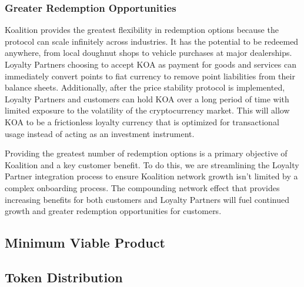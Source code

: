 \subsubsection{Greater Redemption Opportunities}
Koalition provides the greatest flexibility in redemption options because the protocol can scale infinitely across industries. It has the potential to be redeemed anywhere, from local doughnut shops to vehicle purchases at major dealerships. Loyalty Partners choosing to accept KOA as payment for goods and services can immediately convert points to fiat currency to remove point liabilities from their balance sheets. Additionally, after the price stability protocol is implemented, Loyalty Partners and customers can hold KOA over a long period of time with limited exposure to the volatility of the cryptocurrency market.  This will allow KOA to be a frictionless loyalty currency that is optimized for transactional usage instead of acting as an investment instrument. 

Providing the greatest number of redemption options is a primary objective of Koalition and a key customer benefit. To do this, we are streamlining the Loyalty Partner integration process to ensure Koalition network growth isn't limited by a complex onboarding process. The compounding network effect that provides increasing benefits for both customers and Loyalty Partners will fuel continued growth and greater redemption opportunities for customers.

\subsection{Minimum Viable Product}

\subsection{Token Distribution}